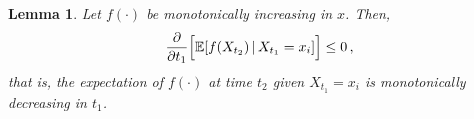 \documentclass[10pt]{article}
\newtheorem{lemma}[theorem]{Lemma}
\newcommand{\dx}[1][x]{\text{\,d}#1}
\begin{document}
\begin{lemma}
Let $f(\cdot)$ be monotonically increasing in $x$. Then,
\begin{equation*}
\frac{\partial}{\partial t_1}\Bigl[\mathbb{E}[f(X_{t_2})\,\vert\,X_{t_1}=x_i]\Bigr] \leq 0\,,
\end{equation*}
that is, the expectation of $f(\cdot)$ at time $t_2$ given $X_{t_1}=x_i$ is monotonically decreasing in $t_1$.
\end{lemma}
\end{document}
